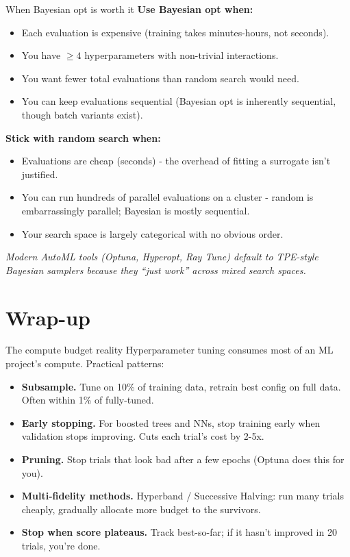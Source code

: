 \documentclass[aspectratio=169]{beamer}
\begin{document}
\begin{frame}{When Bayesian opt is worth it}
  \textbf{Use Bayesian opt when:}
  \begin{itemize}\small
    \item Each evaluation is expensive (training takes minutes-hours, not seconds).
    \item You have $\geq 4$ hyperparameters with non-trivial interactions.
    \item You want fewer total evaluations than random search would need.
    \item You can keep evaluations sequential (Bayesian opt is inherently sequential, though batch variants exist).
  \end{itemize}
  \vfill
  \textbf{Stick with random search when:}
  \begin{itemize}\small
    \item Evaluations are cheap (seconds) - the overhead of fitting a surrogate isn't justified.
    \item You can run hundreds of parallel evaluations on a cluster - random is embarrassingly parallel; Bayesian is mostly sequential.
    \item Your search space is largely categorical with no obvious order.
  \end{itemize}
  \vfill
  \emph{Modern AutoML tools (Optuna, Hyperopt, Ray Tune) default to TPE-style Bayesian samplers because they ``just work'' across mixed search spaces.}
\end{frame}

\section{Wrap-up}

\begin{frame}{The compute budget reality}
  Hyperparameter tuning consumes most of an ML project's compute. Practical patterns:
  \vfill
  \begin{itemize}
    \item \textbf{Subsample.} Tune on 10\% of training data, retrain best config on full data. Often within 1\% of fully-tuned.
    \item \textbf{Early stopping.} For boosted trees and NNs, stop training early when validation stops improving. Cuts each trial's cost by 2-5x.
    \item \textbf{Pruning.} Stop trials that look bad after a few epochs (Optuna does this for you).
    \item \textbf{Multi-fidelity methods.} Hyperband / Successive Halving: run many trials cheaply, gradually allocate more budget to the survivors.
    \item \textbf{Stop when score plateaus.} Track best-so-far; if it hasn't improved in 20 trials, you're done.
  \end{itemize}
  \vfill
\end{frame}
\end{document}
